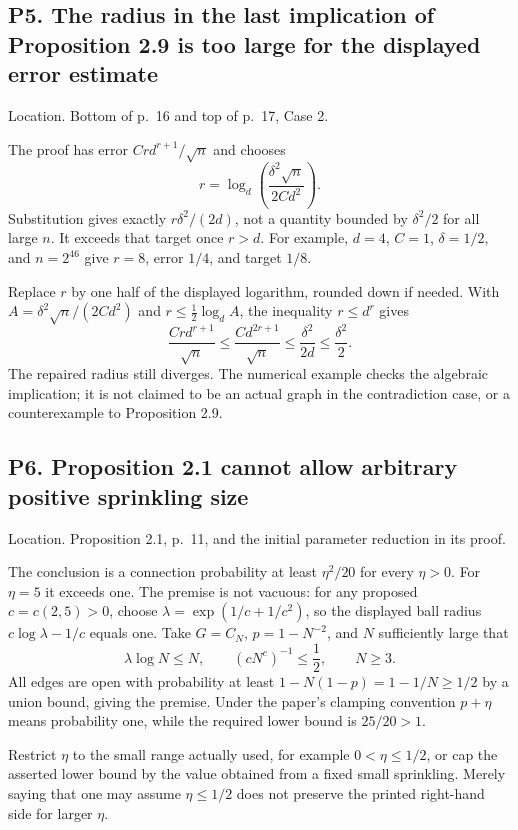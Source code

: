 \documentclass[10pt]{article}
\begin{document}
\subsection*{P5. The radius in the last implication of Proposition 2.9 is too large for the displayed error estimate}
Location. Bottom of p. 16 and top of p. 17, Case 2.\par
The proof has error \(Cr d^{r+1}/\sqrt n\) and chooses \[r=\log_d\left(\frac{\delta^2\sqrt n}{2Cd^2}\right).\] Substitution gives exactly \(r\delta^2/(2d)\), not a quantity bounded by \(\delta^2/2\) for all large \(n\). It exceeds that target once \(r>d\). For example, \(d=4\), \(C=1\), \(\delta=1/2\), and \(n=2^{46}\) give \(r=8\), error \(1/4\), and target \(1/8\).\par
Replace \(r\) by one half of the displayed logarithm, rounded down if needed. With \(A=\delta^2\sqrt n/(2Cd^2)\) and \(r\le\frac12\log_d A\), the inequality \(r\le d^r\) gives \[\frac{Cr d^{r+1}}{\sqrt n}
 \le\frac{Cd^{2r+1}}{\sqrt n}
 \le\frac{\delta^2}{2d}\le\frac{\delta^2}{2}.\] The repaired radius still diverges. The numerical example checks the algebraic implication; it is not claimed to be an actual graph in the contradiction case, or a counterexample to Proposition 2.9.\par
\subsection*{P6. Proposition 2.1 cannot allow arbitrary positive sprinkling size}
Location. Proposition 2.1, p. 11, and the initial parameter reduction in its proof.\par
The conclusion is a connection probability at least \(\eta^2/20\) for every \(\eta>0\). For \(\eta=5\) it exceeds one. The premise is not vacuous: for any proposed \(c=c(2,5)>0\), choose \(\lambda=\exp(1/c+1/c^2)\), so the displayed ball radius \(c\log\lambda-1/c\) equals one. Take \(G=C_N\), \(p=1-N^{-2}\), and \(N\) sufficiently large that \[\lambda\log N\le N,\qquad
 (cN^c)^{-1}\le\frac12,\qquad N\ge3.\] All edges are open with probability at least \(1-N(1-p)=1-1/N\ge1/2\) by a union bound, giving the premise. Under the paper’s clamping convention \(p+\eta\) means probability one, while the required lower bound is \(25/20>1\).\par
Restrict \(\eta\) to the small range actually used, for example \(0<\eta\le1/2\), or cap the asserted lower bound by the value obtained from a fixed small sprinkling. Merely saying that one may assume \(\eta\le1/2\) does not preserve the printed right-hand side for larger \(\eta\).\par
\end{document}
